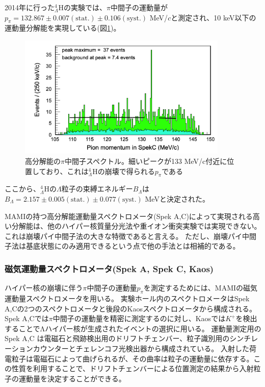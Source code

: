 \documentclass[a4paper,11pt,uplatex]{jsbook}
\begin{document}
2014年に行った$^4_{\Lambda}\text{H}$の実験\cite{Schulz2015}では、$\pi$中間子の運動量が
$p_\pi = 132.867 \pm 0.007(\text{stat.}) \pm 0.106(\text{syst.})$ MeV/$c$と測定され、10 keV以下の運動量分解能を実現している(図\ref{fig:pi_spec})。
\begin{figure}[H]
  \centering
  \includegraphics[width=10cm]{image/1-PionSpectrum.png}
  \caption[過去実験での$p_\pi$スペクトル]{高分解能の$\pi$中間子スペクトル。細いピークが133 MeV/c付近に位置しており、これは$^4_{\Lambda}\text{H}$の崩壊で得られる$p_\pi$である\cite{Schulz2015}}
  \label{fig:pi_spec}
\end{figure}

ここから、$^4_{\Lambda}\text{H}$の$\Lambda$粒子の束縛エネルギー$B_\Lambda$は$B_\Lambda = 2.157 \pm 0.005(\text{stat.}) \pm 0.077(\text{syst.})$ MeVと決定された。

MAMIの持つ高分解能運動量スペクトロメータ(Spek A,C)によって実現される高い分解能は、他のハイパー核質量分光法や重イオン衝突実験では実現できない。
これは崩壊パイ中間子法の大きな特徴であると言える。
ただし、崩壊パイ中間子法は基底状態にのみ適用できるという点で他の手法とは相補的である。

\subsubsection{磁気運動量スペクトロメータ(Spek A, Spek C, Kaos)}
ハイパー核の崩壊に伴う$\pi$中間子の運動量$p_\pi$を測定するためには、MAMIの磁気運動量スペクトロメータを用いる。
実験ホール内のスペクトロメータはSpek A,Cの2つのスペクトロメータと後段のKaosスペクトロメータから構成される。Spek A,Cでは$\pi$中間子の運動量を精密に測定するのに対し、Kaosでは$K^+$を検出することでΛハイパー核が生成されたイベントの選択に用いる。
運動量測定用のSpek A,C は電磁石と飛跡検出用のドリフトチェンバー、粒子識別用のシンチレーションカウンターとチェレンコフ光検出器から構成されている。
入射した荷電粒子は電磁石によって曲げられるが、その曲率は粒子の運動量に依存する。この性質を利用することで、ドリフトチェンバーによる位置測定の結果から入射粒子の運動量を決定することができる。
\end{document}
